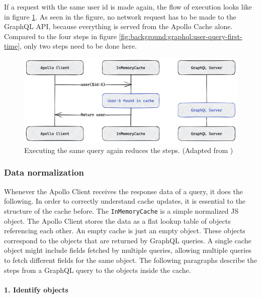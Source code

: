 \noindent If a request with the same user id is made again, the flow of execution looks like in figure \ref{fig:background:graphql:user-query-second-time}. As seen in the figure, no network request has to be made to the GraphQL \ac{API}, because everything is served from the Apollo Cache alone. Compared to the four steps in figure \ref{fig:background:graphql:user-query-first-time}, only two steps need to be done here. \cite{misc:-:background:graphql:apollo-client-cache-overview}

\ifshowImages
\begin{figure}[H]
    \centering
    \includegraphics[width=0.7\linewidth]{images/background/graphql/apollo/apollo-client-basic-cache-warm.jpg}
    \caption{Executing the same query again reduces the steps. (Adapted from \cite{misc:-:background:graphql:apollo-client-cache-overview})}\label{fig:background:graphql:user-query-second-time}
\end{figure}
\fi

\subsubsection{Data normalization}\label{subsubsection:background:graphql:apollo-server-client:data-normalization}

Whenever the Apollo Client receives the response data of a query, it does the following. In order to correctly understand cache updates, it is essential to the structure of the cache before. The \texttt{InMemoryCache} is a simple normalized \ac{JS} object. The Apollo Client stores the data as a flat lookup table of objects referencing each other. An empty cache is just an empty object. These objects correspond to the objects that are returned by GraphQL queries. A single cache object might include fields fetched by multiple queries, allowing multiple queries to fetch different fields for the same object. \cite{misc:-:background:graphql:apollo-client-cache-overview} The following paragraphs describe the steps from a GraphQL query to the objects inside the cache.

\paragraph{1. Identify objects}\label{paragraph:background:graphql:apollo-server-client:data-normalization:identify-objects}

